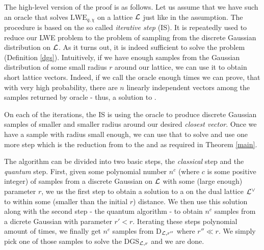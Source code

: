 The high-level version of the proof is as follows. Let us assume that we have such an oracle that solves $\text{LWE}_{q, \chi}$ on a lattice $\mathcal{L}$ just like in the assumption. The procedure is based on the so called \textit{iterative step} (IS). It is repeatedly used to reduce our LWE problem to the problem of sampling from the  discrete Gaussian distribution on $\mathcal{L}$. As it turns out, it is indeed sufficient to solve the  problem (Definition \ref{dgs}). Intuitively, if we have enough samples from the Gaussian distribution of some small radius $r$ around our lattice, we can use it to obtain short lattice vectors. Indeed, if we call the  oracle enough times we can prove, that with very high probability, there are $n$ linearly independent vectors among the samples returned by oracle - thus, a solution to .

On each of the iterations, the IS is using the oracle to produce discrete Gaussian samples of smaller and smaller radius around our desired \textit{closest vector}. Once we have a sample with radius small enough, we can use that to solve  and use one more step which is the reduction from  to the  and  as required in Theorem \ref{main}.

\begin{center}
\end{center}

The algorithm can be divided into two basic steps, the \textit{classical} step and the \textit{quantum} step. First, given some polynomial number $n^c$ (where $c$ is some positive integer) of samples from a discrete Gaussian on $\mathcal{L}$ with some (large enough) parameter $r$, we us the first step to obtain a solution to a  on the dual lattice $\mathcal{L}^{\vee}$ to within some (smaller than the initial $r$) distance. We then use this solution along with the second step - the quantum algorithm - to obtain $n^c$ samples from a dicrete Gaussian with parameter $r' < r$. Iterating these steps polynomial amount of times, we finally get $n^c$ samples from D$_{\mathcal{L}, r''}$ where $r'' \ll r$. We simply pick one of those samples to solve the DGS$_{\mathcal{L}, r}$ and we are done.

